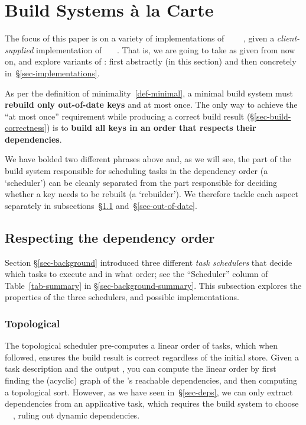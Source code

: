 \section{Build Systems \`a la Carte}\label{sec-build}

The focus of this paper is on a variety of implementations of
~~~~, given
a \emph{client-supplied} implementation of ~~~. That
is, we are going to take  as given from now on, and explore variants of
: first abstractly (in this section) and then concretely
in~\S\ref{sec-implementations}.

As per the definition of minimality~\ref{def-minimal}, a minimal build
system must \textbf{rebuild only out-of-date keys} and at most once. The only
way to achieve the ``at most once'' requirement while producing a correct build
result (\S\ref{sec-build-correctness}) is to \textbf{build all keys in an
order that respects their dependencies}.

\vspace{1mm}
We have bolded two different phrases above and, as we will see, the part of the
build system responsible for scheduling tasks in the dependency order
(a `scheduler') can be cleanly separated from the part responsible for deciding
whether a key needs to be rebuilt (a `rebuilder'). We therefore tackle each
aspect separately in subsections~\S\ref{sec-dependency-orderings}
and~\S\ref{sec-out-of-date}.

\subsection{Respecting the dependency order}
\label{sec-dependency-orderings}

Section \S\ref{sec-background} introduced three different \emph{task schedulers}
that decide which tasks to execute and in what order; see the ``Scheduler'' column
of Table~\ref{tab-summary} in \S\ref{sec-background-summary}.
This subsection explores the properties of the three schedulers, and
possible implementations.

\vspace{-2mm}
\subsubsection{Topological}\label{sec-topological}

The topological scheduler pre-computes a linear order of tasks, which when followed,
ensures the build result is correct regardless of the initial store. Given a
task description and the output , you can compute the linear order by
first finding the (acyclic) graph of the 's reachable dependencies, and
then computing a topological sort. However, as we have seen in~\S\ref{sec-deps},
we can only extract dependencies from an applicative task, which requires the
build system to choose ~\hs{=}~, ruling out dynamic
dependencies.

